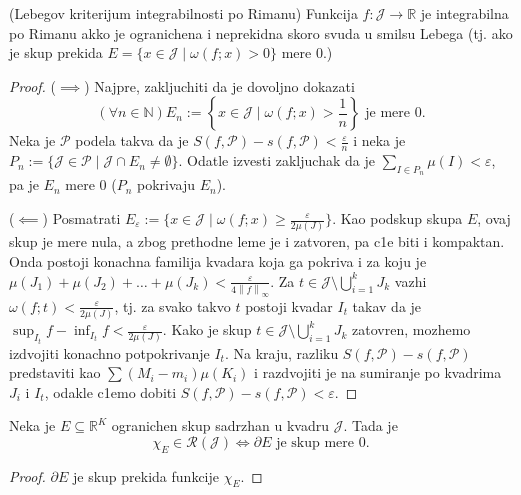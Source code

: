 \documentclass[a4paper,12pt]{article}
\newcommand{\NN}{\mathbb{N}}
\newcommand{\RR}{\mathbb{R}}
\newcommand{\eps}{\varepsilon}
\newcommand{\psj}{\subseteq}
\newcommand{\ds}{\displaystyle}
\newcommand{\norm}[1]{\left\lVert#1\right\rVert}
\begin{document}
\begin{tma}(Lebegov kriterijum integrabilnosti po Rimanu)
	Funkcija $f: \mathcal J \to \RR$ je integrabilna po Rimanu akko je ogranichena i neprekidna skoro svuda u smilsu Lebega 
	(tj. ako je skup prekida \( E = \{x \in \mathcal J \mid \omega(f; x) > 0\} \) mere 0.)
\end{tma}
\begin{proof}
	($\implies$)
	Najpre, zakljuchiti da je dovoljno dokazati 
	\[ (\forall n \in \NN) E_n :=  \left\{x \in \mathcal J \mid \omega(f; x) > \frac{1}{n}\right\} \text{ je mere 0.}\] 
	Neka je $\mathcal P$ podela takva da je $S(f, \mathcal P) - s(f, \mathcal P) < \frac{\eps}{n}$ i neka je 
	\( P_n := \{\mathcal J \in \mathcal P \mid \mathcal J \cap E_n \neq \emptyset\} \).
	Odatle izvesti zakljuchak da je \( \ds{\sum_{I \in P_n} \mu(I) < \eps} \), pa je $E_n$ mere 0 ($P_n$ pokrivaju $E_n$).

	($\impliedby$)
	Posmatrati $E_\eps := \{ x\in \mathcal J \mid \omega(f; x) \geq \frac{\eps}{2\mu(J)}\}$. Kao podskup skupa $E$,
	ovaj skup je mere nula, a zbog prethodne leme je i zatvoren, pa c1e biti i kompaktan. Onda postoji konachna familija 
	kvadara koja ga pokriva i za koju je $\mu(J_1) + \mu(J_2) + \dotso + \mu(J_k) < \frac{\eps}{4\norm{f}_\infty}$.
	Za $t \in \mathcal J \setminus \bigcup_{i=1}^k J_k$ vazhi \( \omega(f; t) < \frac{\eps}{2\mu(J)}\), tj.
	za svako takvo $t$ postoji kvadar $I_t$ takav da je $\sup_{I_t}f - \inf_{I_t}f< \frac{\eps}{2\mu(J)} $.
	Kako je skup $t \in \mathcal J \setminus \bigcup_{i=1}^k J_k$ zatovren, mozhemo izdvojiti konachno potpokrivanje $I_t$.
	Na kraju, razliku $S(f, \mathcal P) - s(f, \mathcal P)$ predstaviti kao $\sum (M_i - m_i) \mu(K_i)$ i razdvojiti je 
	na sumiranje po kvadrima $J_i$ i $I_t$, odakle c1emo dobiti $S(f, \mathcal P) - s(f, \mathcal P) < \eps$.
\end{proof}

\begin{posl}
	Neka je $E\psj \RR^K$ ogranichen skup sadrzhan u kvadru $\mathcal J$. Tada je 
	\[ \chi_E \in \mathcal R (\mathcal J) \iff \partial E \text{ je skup mere 0} .\] 
\end{posl}
\begin{proof}
	$\partial E$ je skup prekida funkcije $\chi_E$.
\end{proof}
\end{document}
